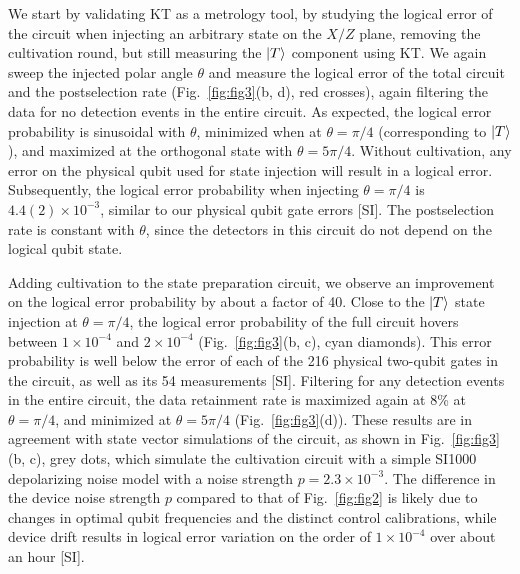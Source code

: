 \documentclass[%
 reprint,
 amsmath,amssymb,
 aps,
]{revtex4-2}
\begin{document}
We start by validating KT as a metrology tool, by studying the logical error of the circuit when injecting an arbitrary state on the $X/Z$ plane, removing the cultivation round, but still measuring the $\ket{T}$ component using KT. We again sweep the injected polar angle $\theta$ and measure the logical error of the total circuit and the postselection rate (Fig.~\ref{fig:fig3}(b, d), red crosses), again filtering the data for no detection events in the entire circuit. As expected, the logical error probability is sinusoidal with $\theta$, minimized when at $\theta=\pi/4$ (corresponding to $\ket{T}$), and maximized at the orthogonal state with $\theta = 5\pi/4$. Without cultivation, any error on the physical qubit used for state injection will result in a logical error. Subsequently, the logical error probability when injecting $\theta = \pi/4$ is $4.4(2) \times 10^{-3}$, similar to our physical qubit gate errors [SI]. The postselection rate is constant with $\theta$, since the detectors in this circuit do not depend on the logical qubit state.

Adding cultivation to the state preparation circuit, we observe an improvement on the logical error probability by about a factor of 40. Close to the $\ket{T}$ state injection at $\theta = \pi/4$, the logical error probability of the full circuit hovers between $1 \times 10^{-4}$ and $2 \times 10^{-4}$ (Fig.~\ref{fig:fig3}(b, c), cyan diamonds). This error probability is well below the error of each of the 216 physical two-qubit gates in the circuit, as well as its 54 measurements [SI].
Filtering for any detection events in the entire circuit, the data retainment rate is maximized again at 8\% at $\theta = \pi/4$, and minimized at $\theta = 5\pi/4$ (Fig.~\ref{fig:fig3}(d)). These results are in agreement with state vector simulations of the circuit, as shown in Fig.~\ref{fig:fig3}(b, c), grey dots, which simulate the cultivation circuit with a simple SI1000 depolarizing noise model \cite{gidney_fault-tolerant_2021} with a noise strength $p = 2.3 \times 10^{-3}$. The difference in the device noise strength $p$ compared to that of Fig.~\ref{fig:fig2} is likely due to changes in optimal qubit frequencies and the distinct control calibrations, while device drift results in logical error variation on the order of $1 \times 10^{-4}$ over about an hour [SI].
\end{document}
